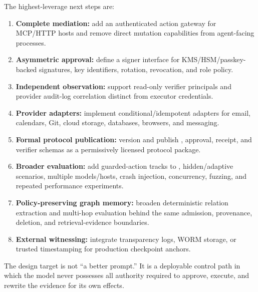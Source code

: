 The highest-leverage next steps are:

\begin{enumerate}
  \item \textbf{Complete mediation:} add an authenticated action gateway for MCP/HTTP hosts and remove direct mutation capabilities from agent-facing processes.
  \item \textbf{Asymmetric approval:} define a signer interface for KMS/HSM/passkey-backed signatures, key identifiers, rotation, revocation, and role policy.
  \item \textbf{Independent observation:} support read-only verifier principals and provider audit-log correlation distinct from executor credentials.
  \item \textbf{Provider adapters:} implement conditional/idempotent adapters for email, calendars, Git, cloud storage, databases, browsers, and messaging.
  \item \textbf{Formal protocol publication:} version and publish \worldpatch{}, approval, receipt, and verifier schemas as a permissively licensed protocol package.
  \item \textbf{Broader evaluation:} add guarded-action tracks to \benchmark{}, hidden/adaptive scenarios, multiple models/hosts, crash injection, concurrency, fuzzing, and repeated performance experiments.
  \item \textbf{Policy-preserving graph memory:} broaden deterministic relation extraction and multi-hop evaluation behind the same admission, provenance, deletion, and retrieval-evidence boundaries.
  \item \textbf{External witnessing:} integrate transparency logs, WORM storage, or trusted timestamping for production checkpoint anchors.
\end{enumerate}

The design target is not ``a better prompt.'' It is a deployable control path in which the model never possesses all authority required to approve, execute, and rewrite the evidence for its own effects.
